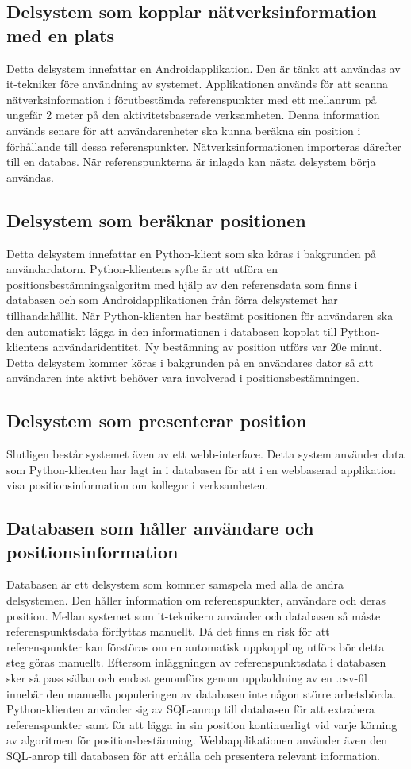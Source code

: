 \documentclass[a4paper,12pt]{article}
\begin{document}
 \subsection{Delsystem som kopplar nätverksinformation med en plats}
 Detta delsystem innefattar en Androidapplikation. Den är tänkt att användas av it-tekniker före användning av systemet. Applikationen används för att scanna nätverksinformation i förutbestämda referenspunkter med ett mellanrum på ungefär 2 meter på den aktivitetsbaserade verksamheten. Denna information används senare för att användarenheter ska kunna beräkna sin position i förhållande till dessa referenspunkter. Nätverksinformationen importeras därefter till en databas. När referenspunkterna är inlagda kan nästa delsystem börja användas.

 \subsection{Delsystem som beräknar positionen}
 Detta delsystem innefattar en Python-klient som ska köras i bakgrunden på användardatorn. Python-klientens syfte är att utföra en positionsbestämningsalgoritm med hjälp av den referensdata som finns i databasen och som Androidapplikationen från förra delsystemet har tillhandahållit. När Python-klienten har bestämt positionen för användaren ska den automatiskt lägga in den informationen i databasen kopplat till Python-klientens användaridentitet. Ny bestämning av position utförs var 20e minut. Detta delsystem kommer köras i bakgrunden på en användares dator så att användaren inte aktivt behöver vara involverad i positionsbestämningen.

 \subsection{Delsystem som presenterar position}
 Slutligen består systemet även av ett webb-interface. Detta system använder data som Python-klienten har lagt in i databasen för att i en webbaserad applikation visa positionsinformation om kollegor i verksamheten.

 \subsection{Databasen som håller användare och positionsinformation}
 Databasen är ett delsystem som kommer samspela med alla de andra delsystemen. Den håller information om referenspunkter, användare och deras position.
 Mellan systemet som it-teknikern använder och databasen så måste referenspunktsdata förflyttas manuellt. Då det finns en risk för att referenspunkter kan förstöras om en automatisk uppkoppling utförs bör detta steg göras manuellt. Eftersom inläggningen av referenspunktsdata i databasen sker så pass sällan och endast genomförs genom uppladdning av en .csv-fil innebär den manuella populeringen av databasen inte någon större arbetsbörda. Python-klienten använder sig av SQL-anrop till databasen för att extrahera referenspunkter samt för att lägga in sin position kontinuerligt vid varje körning av algoritmen för positionsbestämning. Webbapplikationen använder även den SQL-anrop till databasen för att erhålla och presentera relevant information.
\end{document}
